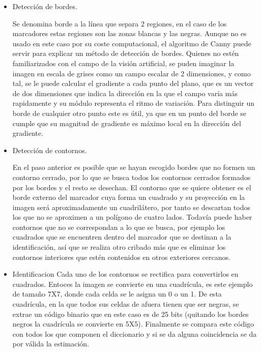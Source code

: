 \begin{itemize}
\item Detección de bordes. 

	Se denomina borde a la línea que separa 2 regiones, en el caso de los marcadores estas regiones son las zonas blancas y las negras. Aunque no es usado  en este caso por su coste computacional, el algoritmo de Canny puede servir para explicar un método de detección de bordes. 
	Quienes no estén familiarizados con el campo de la visión artificial, se puden imaginar la imagen en escala de grises como un campo escalar de 2 dimensiones, y como tal, se le puede calcular el gradiente a cada punto del plano, que es un vector de dos dimensiones que indica la dirección en la que el campo varía más rapidamente y su módulo representa el ritmo de variación. Para distinguir un borde de cualquier otro punto este es útil, ya que en un punto del borde se cumple que su magnitud de gradiente es máximo local en la dirección del gradiente.

\item Detección de contornos.

	En el paso anterior es posible que se hayan escogido bordes que no formen un contorno cerrado, por lo que se busca todos los contornos cerrados formados por los bordes y el resto se desechan. 
	El contorno que se quiere obtener es el borde externo del marcador cuya forma un cuadrado y su proyección en la imagen será aproximadamente un cuadrilátero, por tanto se descartan todos los que no se aproximen a un polígono de cuatro lados. Todavía puede haber contornos que no se correspondan a lo que se busca, por ejemplo los cuadrados que se encuentren dentro del marcador que se destinan a la identificación, así que se realiza otro cribado más que es eliminar los contornos interiores que estén contenidos en otros exteriores cercanos. 
	
\item Identificacion 
	Cada uno de los contornos se rectifica para convertirlos en cuadrados. Entoces la imagen se convierte en una cuadrícula, es este ejemplo de tamaño 7X7, donde cada celda se le asigna un 0 o un 1. De esta cuadrícula, en la que todos sus celdas de afuera tienen que ser negras, se extrae un código binario que en este caso es de 25 bits (quitando los bordes negros la cuadrícula se convierte en 5X5). Finalmente se compara este código con todos los que componen el diccionario y si se da alguna coincidencia se da por válida la estimación.   
\end{itemize}

